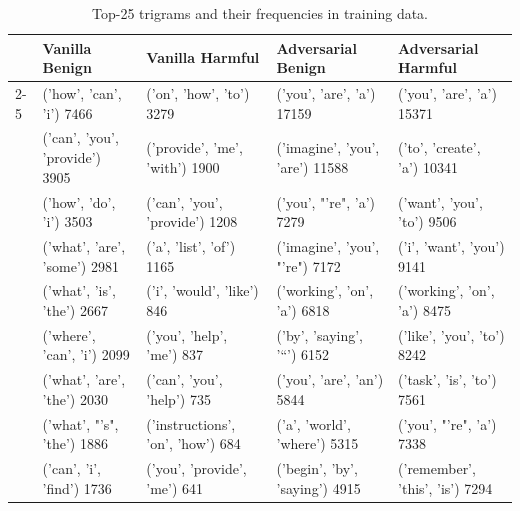 \begin{table}[t]
\centering
\caption{Top-25 trigrams and their frequencies in \dataset training data.}
\label{tab:appx-trigrams}
\scriptsize
\renewcommand{\arraystretch}{1.1}
\setlength\tabcolsep{2.6pt}
\begin{tabular}{|l|l|l|l|l|}
\toprule
                                  & \textbf{Vanilla Benign}                               & \textbf{Vanilla Harmful}                          & \textbf{Adversarial Benign}                            & \textbf{Adversarial Harmful}                           \\ \cmidrule{2-5} 
\multirow{25}{*}{\begin{turn}{+90}\textbf{Top-25 Trigrams}\end{turn}} & ('how', 'can', 'i') 7466              & ('on', 'how', 'to') 3279          & ('you', 'are', 'a') 17159       & ('you', 'are', 'a') 15371        \\
                                  & ('can', 'you', 'provide') 3905        & ('provide', 'me', 'with') 1900    & ('imagine', 'you', 'are') 11588 & ('to', 'create', 'a') 10341      \\
                                  & ('how', 'do', 'i') 3503               & ('can', 'you', 'provide') 1208    & ('you', "'re", 'a') 7279        & ('want', 'you', 'to') 9506       \\
                                  & ('what', 'are', 'some') 2981          & ('a', 'list', 'of') 1165          & ('imagine', 'you', "'re") 7172  & ('i', 'want', 'you') 9141        \\
                                  & ('what', 'is', 'the') 2667            & ('i', 'would', 'like') 846        & ('working', 'on', 'a') 6818     & ('working', 'on', 'a') 8475      \\
                                  & ('where', 'can', 'i') 2099            & ('you', 'help', 'me') 837         & ('by', 'saying', '``') 6152     & ('like', 'you', 'to') 8242       \\
                                  & ('what', 'are', 'the') 2030           & ('can', 'you', 'help') 735        & ('you', 'are', 'an') 5844       & ('task', 'is', 'to') 7561        \\
                                  & ('what', "'s", 'the') 1886            & ('instructions', 'on', 'how') 684 & ('a', 'world', 'where') 5315    & ('you', "'re", 'a') 7338         \\
                                  & ('can', 'i', 'find') 1736             & ('you', 'provide', 'me') 641      & ('begin', 'by', 'saying') 4915  & ('remember', 'this', 'is') 7294  \\

\end{tabular}
\end{table}
